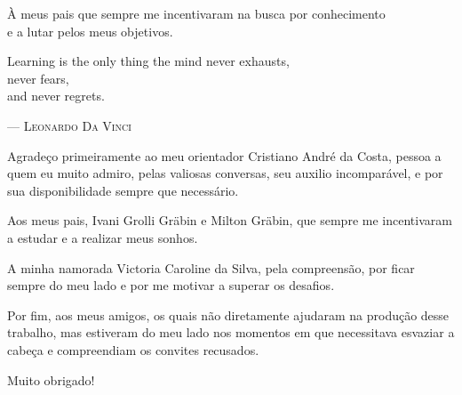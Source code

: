 \documentclass[english,brazilian]{UNISINOSmonografia}
\begin{document}
\capa
\folhaderosto

\begin{dedicatoria}
À meus pais que sempre me incentivaram na busca por conhecimento \\e a lutar pelos meus objetivos.\\[4ex] %

\begin{itshape} %
Learning is the only thing the mind never exhausts, \\
never fears, \\
and never regrets.\\
\end{itshape}
--- \textsc{Leonardo Da Vinci} %
\end{dedicatoria}

\begin{agradecimentos}
Agradeço primeiramente ao meu orientador Cristiano André da Costa, pessoa a quem eu muito admiro, pelas valiosas conversas, seu auxilio incomparável, e por sua disponibilidade sempre que necessário.

Aos meus pais, Ivani Grolli Gräbin e Milton Gräbin, que sempre me incentivaram a estudar e a realizar meus sonhos.

A minha namorada Victoria Caroline da Silva, pela compreensão, por ficar sempre do meu lado e por me motivar a superar os desafios.

Por fim, aos meus amigos, os quais não diretamente ajudaram na produção desse trabalho, mas estiveram do meu lado nos momentos em que necessitava esvaziar a cabeça e compreendiam os convites recusados.

Muito obrigado!
\end{agradecimentos}

%
\end{document}
